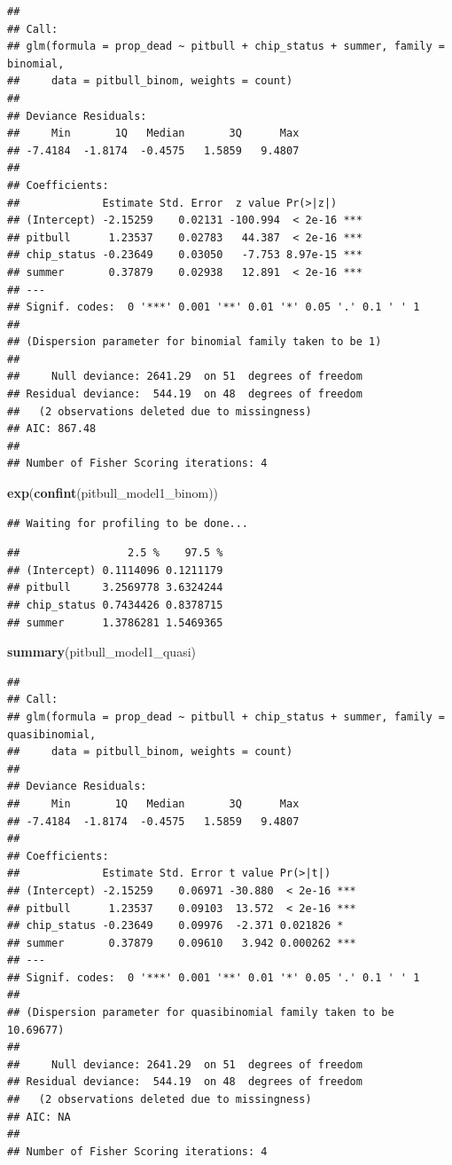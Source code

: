\documentclass[]{article}
\newenvironment{Shaded}{\begin{snugshade}}{\end{snugshade}}
\newcommand{\KeywordTok}[1]{\textcolor[rgb]{0.13,0.29,0.53}{\textbf{#1}}}
\newcommand{\NormalTok}[1]{#1}
\begin{document}
\begin{verbatim}
## 
## Call:
## glm(formula = prop_dead ~ pitbull + chip_status + summer, family = binomial, 
##     data = pitbull_binom, weights = count)
## 
## Deviance Residuals: 
##     Min       1Q   Median       3Q      Max  
## -7.4184  -1.8174  -0.4575   1.5859   9.4807  
## 
## Coefficients:
##             Estimate Std. Error  z value Pr(>|z|)    
## (Intercept) -2.15259    0.02131 -100.994  < 2e-16 ***
## pitbull      1.23537    0.02783   44.387  < 2e-16 ***
## chip_status -0.23649    0.03050   -7.753 8.97e-15 ***
## summer       0.37879    0.02938   12.891  < 2e-16 ***
## ---
## Signif. codes:  0 '***' 0.001 '**' 0.01 '*' 0.05 '.' 0.1 ' ' 1
## 
## (Dispersion parameter for binomial family taken to be 1)
## 
##     Null deviance: 2641.29  on 51  degrees of freedom
## Residual deviance:  544.19  on 48  degrees of freedom
##   (2 observations deleted due to missingness)
## AIC: 867.48
## 
## Number of Fisher Scoring iterations: 4
\end{verbatim}

\begin{Shaded}
\begin{Highlighting}[]
\KeywordTok{exp}\NormalTok{(}\KeywordTok{confint}\NormalTok{(pitbull_model1_binom))}
\end{Highlighting}
\end{Shaded}

\begin{verbatim}
## Waiting for profiling to be done...
\end{verbatim}

\begin{verbatim}
##                 2.5 %    97.5 %
## (Intercept) 0.1114096 0.1211179
## pitbull     3.2569778 3.6324244
## chip_status 0.7434426 0.8378715
## summer      1.3786281 1.5469365
\end{verbatim}

\begin{Shaded}
\begin{Highlighting}[]
\KeywordTok{summary}\NormalTok{(pitbull_model1_quasi)}
\end{Highlighting}
\end{Shaded}

\begin{verbatim}
## 
## Call:
## glm(formula = prop_dead ~ pitbull + chip_status + summer, family = quasibinomial, 
##     data = pitbull_binom, weights = count)
## 
## Deviance Residuals: 
##     Min       1Q   Median       3Q      Max  
## -7.4184  -1.8174  -0.4575   1.5859   9.4807  
## 
## Coefficients:
##             Estimate Std. Error t value Pr(>|t|)    
## (Intercept) -2.15259    0.06971 -30.880  < 2e-16 ***
## pitbull      1.23537    0.09103  13.572  < 2e-16 ***
## chip_status -0.23649    0.09976  -2.371 0.021826 *  
## summer       0.37879    0.09610   3.942 0.000262 ***
## ---
## Signif. codes:  0 '***' 0.001 '**' 0.01 '*' 0.05 '.' 0.1 ' ' 1
## 
## (Dispersion parameter for quasibinomial family taken to be 10.69677)
## 
##     Null deviance: 2641.29  on 51  degrees of freedom
## Residual deviance:  544.19  on 48  degrees of freedom
##   (2 observations deleted due to missingness)
## AIC: NA
## 
## Number of Fisher Scoring iterations: 4
\end{verbatim}
\end{document}
